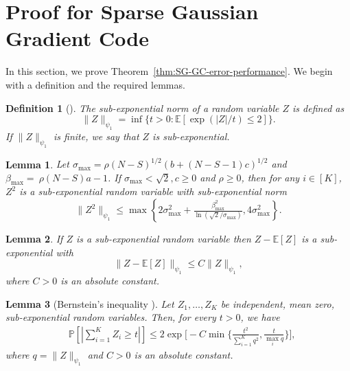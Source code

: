 \documentclass[lettersize,journal]{IEEEtran}
\newcommand{\prob}[1]{\mathbb{P}\left[#1\right]}
\newcommand{\ex}[1]{\mathbb{E}\left[#1\right]}
\newcommand{\psione}[1]{\|#1\|_{\psi_1} }
\newcommand{\sigmamax}{\sigma_{\max}}
\newcommand{\betamax}{\beta_{\max}}
\newtheorem{definition}{Definition}
\newtheorem{lemma}{Lemma}
\begin{document}
{\appendices

\section{Proof for Sparse Gaussian Gradient Code}
In this section, we prove Theorem~\ref{thm:SG-GC-error-performance}. We begin with a definition and the required lemmas.
\begin{definition}[{\cite[Definition 2.7.5]{vershynin2020high}}]
\label{def:sub-exponential}
    The sub-exponential norm of a random variable $Z$ is defined as
    \[
        \psione{Z} = \inf\{t>0:\ex{\exp(|Z|/t)\le 2}\}.
    \]
    If $\psione{Z}$ is finite, we say that $Z$ is sub-exponential.
\end{definition}

\begin{lemma}
\label{lemma:psi-two-upper-bound}
 Let ${\sigmamax} = \rho(N-S)^{1/2}(b+(N-S-1)c)^{1/2}$ and $\betamax=~\rho(N-S)a-1$. If $\sigma_{\max} < \sqrt{2}, c\ge0$ and $\rho \ge0$, then for any $i \in [K]$, $Z^2$ is a sub-exponential random variable with sub-exponential norm
    \[\psione{Z^2} \le \max\left\{2\sigmamax^2 + \tfrac{\betamax^2}{\ln{(\sqrt{2}/\sigmamax)}}, 4\sigmamax^2 \right\}.\]
\end{lemma}

\begin{lemma} If $Z$ is a sub-exponential random variable then $Z-\ex{Z}$ is a sub-exponential with
\label{lemma:centering-a-sub-exponential-random-variable}
\[
    \psione{Z-\ex{Z}} \leq C\psione{Z},
\]
where $C>0$ is an absolute constant.
\end{lemma}

\begin{lemma}[Bernstein's inequality {\cite[Theorem 2.8.1]{vershynin2020high}}]
\label{lem:bernstein's-inequality}
    Let $Z_1, \dots, Z_K$ be independent, mean zero, sub-exponential random variables. Then, for every $t>0$, we have
    \begin{align*}
        &\prob{\left|\textstyle{\textstyle\sum_{i=1}^K Z_i\ge t}\right|}\le 2\exp\Big[
            -C\min\big\{
                \tfrac{t^2}{\sum_{i=1}^Kq^2},
                \tfrac{t}{\max_iq}
            \Big\}
        \Big],
    \end{align*}
    where $q = \psione{Z}$ and $C>0$ is an absolute constant.
\end{lemma}

}
\end{document}
